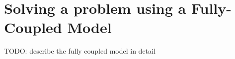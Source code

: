\section[Fully-coupled model]{Solving a problem using a Fully-Coupled Model}\label{tutorial-coupled}

TODO: describe the fully coupled model in detail
